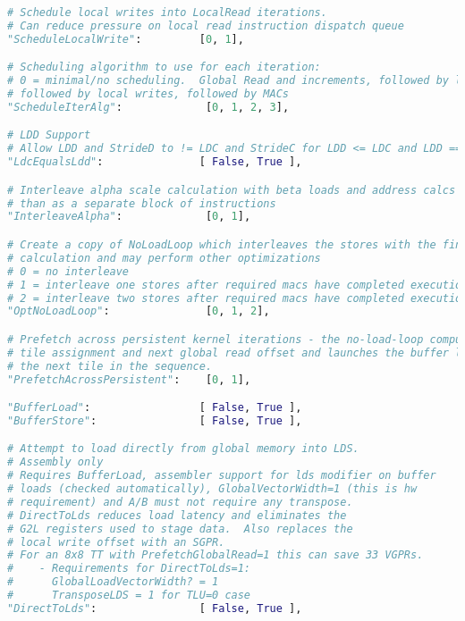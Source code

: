 \documentclass[]{article}
\begin{document}
\begin{lstlisting}[language=python,breaklines=true]
# Schedule local writes into LocalRead iterations.
# Can reduce pressure on local read instruction dispatch queue
"ScheduleLocalWrite":         [0, 1],

# Scheduling algorithm to use for each iteration:
# 0 = minimal/no scheduling.  Global Read and increments, followed by local reads,
# followed by local writes, followed by MACs
"ScheduleIterAlg":             [0, 1, 2, 3],

# LDD Support
# Allow LDD and StrideD to != LDC and StrideC for LDD <= LDC and LDD == M
"LdcEqualsLdd":               [ False, True ],

# Interleave alpha scale calculation with beta loads and address calcs - rather
# than as a separate block of instructions
"InterleaveAlpha":             [0, 1],

# Create a copy of NoLoadLoop which interleaves the stores with the final mac
# calculation and may perform other optimizations
# 0 = no interleave
# 1 = interleave one stores after required macs have completed execution
# 2 = interleave two stores after required macs have completed execution
"OptNoLoadLoop":               [0, 1, 2],

# Prefetch across persistent kernel iterations - the no-load-loop computes the
# tile assignment and next global read offset and launches the buffer loads for
# the next tile in the sequence.
"PrefetchAcrossPersistent":    [0, 1],

"BufferLoad":                 [ False, True ],
"BufferStore":                [ False, True ],

# Attempt to load directly from global memory into LDS.
# Assembly only
# Requires BufferLoad, assembler support for lds modifier on buffer
# loads (checked automatically), GlobalVectorWidth=1 (this is hw
# requirement) and A/B must not require any transpose.
# DirectToLds reduces load latency and eliminates the
# G2L registers used to stage data.  Also replaces the
# local write offset with an SGPR.
# For an 8x8 TT with PrefetchGlobalRead=1 this can save 33 VGPRs.
#    - Requirements for DirectToLds=1:
#      GlobalLoadVectorWidth? = 1
#      TransposeLDS = 1 for TLU=0 case
"DirectToLds":                [ False, True ],


\end{lstlisting}
\end{document}
